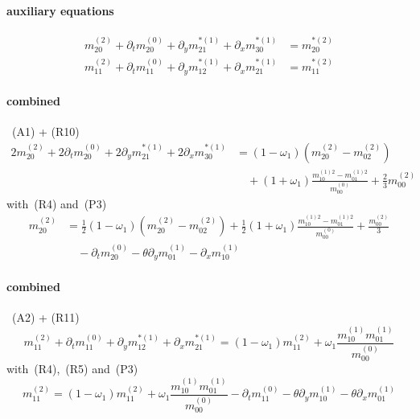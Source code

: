 \documentclass{article}
\begin{document}
  \paragraph{auxiliary equations}
  \begin{align}
    m_{20}^{(2)} + \partial_t m_{20}^{(0)} + \partial_y m_{21}^{*(1)} + \partial_x m_{30}^{*(1)} &= m_{20}^{*(2)} \tag{A2} \\
    m_{11}^{(2)} + \partial_t m_{11}^{(0)} + \partial_y m_{12}^{*(1)} + \partial_x m_{21}^{*(1)} &= m_{11}^{*(2)} \tag{A2}
  \end{align}

  \paragraph{combined}~(A1) + (R10)
  \begin{equation*}
    \begin{aligned}
      2m_{20}^{(2)} + 2\partial_t m_{20}^{(0)} + 2\partial_y m_{21}^{*(1)} + 2\partial_x m_{30}^{*(1)}
      &= (1-\omega_1) (m_{20}^{(2)}-m_{02}^{(2)})
      \\&\quad
      + (1+\omega_1)\frac{ m_{10}^{(1)2} - m_{01}^{(1)2}}{m_{00}^{(0)}} + \frac{2 }{3}m_{00}^{(2)}
    \end{aligned}
  \end{equation*}
  with~(R4) and~(P3)
  \begin{equation}
    \tag{C1}
    \begin{aligned}
      m_{20}^{(2)} &= \frac{1}{2}(1-\omega_1) (m_{20}^{(2)}-m_{02}^{(2)})
      + \frac{1}{2}(1+\omega_1)\frac{ m_{10}^{(1)2} - m_{01}^{(1)2}}{m_{00}^{(0)}} + \frac{ m_{00}^{(2)}}{3}
      \\&\quad
      - \partial_t m_{20}^{(0)} - \theta\partial_y m_{01}^{(1)} - \partial_x m_{10}^{(1)}
    \end{aligned}
  \end{equation}
  \paragraph{combined}~(A2) + (R11)
  \begin{equation*}
    m_{11}^{(2)} + \partial_t m_{11}^{(0)} + \partial_y m_{12}^{*(1)} + \partial_x m_{21}^{*(1)} = (1-\omega_1)m_{11}^{(2)} + \omega_1 \frac{ m_{10}^{(1)}m_{01}^{(1)}}{m_{00}^{(0)}}
  \end{equation*}
  with~(R4),~(R5) and~(P3)
  \begin{equation}
    \tag{C2}
    m_{11}^{(2)} = (1-\omega_1)m_{11}^{(2)} + \omega_1 \frac{ m_{10}^{(1)}m_{01}^{(1)}}{m_{00}^{(0)}}  - \partial_t m_{11}^{(0)} - \theta\partial_y m_{10}^{(1)} - \theta\partial_x m_{01}^{(1)}
  \end{equation}
  \pagebreak
\end{document}
